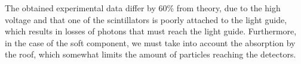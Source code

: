 The obtained experimental data differ by 60\% from theory, due to the high voltage and that one of the scintillators is poorly attached to the light guide, which results in losses of photons that must reach the light guide. Furthermore, in the case of the soft component, we must take into account the absorption by the roof, which somewhat limits the amount of particles reaching the detectors.
